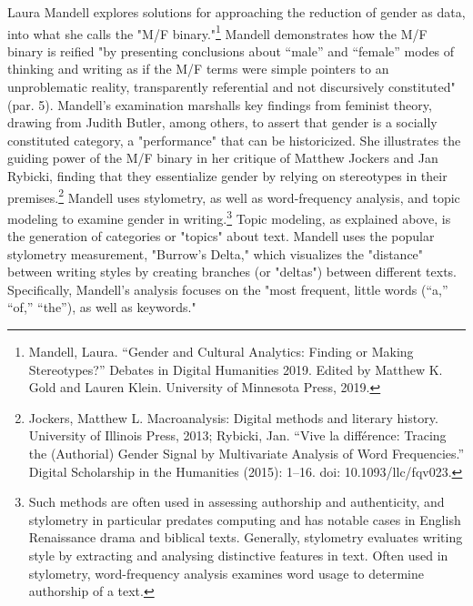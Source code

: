 \documentclass[11pt]{article}
\begin{document}
Laura Mandell explores solutions for approaching the reduction of
gender as data, into what she calls the "M/F binary."\footnote{Mandell, Laura. “Gender and Cultural Analytics: Finding or
Making Stereotypes?” Debates in Digital Humanities 2019. Edited by
Matthew K. Gold and Lauren Klein. University of Minnesota Press, 2019.} Mandell
demonstrates how the M/F binary is reified "by presenting conclusions
about “male” and “female” modes of thinking and writing as if the M/F
terms were simple pointers to an unproblematic reality, transparently
referential and not discursively constituted" (par. 5). Mandell's
examination marshalls key findings from feminist theory, drawing from
Judith Butler, among others, to assert that gender is a socially
constituted category, a "performance" that can be historicized. She
illustrates the guiding power of the M/F binary in her critique of
Matthew Jockers and Jan Rybicki, finding that they essentialize gender
by relying on stereotypes in their premises.\footnote{Jockers, Matthew L. Macroanalysis: Digital methods and literary
history. University of Illinois Press, 2013; Rybicki, Jan. “Vive la
différence: Tracing the (Authorial) Gender Signal by Multivariate
Analysis of Word Frequencies.” Digital Scholarship in the Humanities
(2015): 1–16. doi: 10.1093/llc/fqv023.} Mandell uses
stylometry, as well as word-frequency analysis, and topic modeling to
examine gender in writing.\footnote{Such methods are often used in assessing authorship and
authenticity, and stylometry in particular predates computing and has
notable cases in English Renaissance drama and biblical
texts. Generally, stylometry evaluates writing style by extracting and
analysing distinctive features in text. Often used in stylometry,
word-frequency analysis examines word usage to determine authorship of
a text.} Topic modeling, as explained above,
is the generation of categories or "topics" about text. Mandell uses
the popular stylometry measurement, "Burrow's Delta," which visualizes
the "distance" between writing styles by creating branches (or
"deltas") between different texts. Specifically, Mandell's analysis
focuses on the "most frequent, little words (“a,” “of,” “the”), as
well as keywords."
\end{document}
